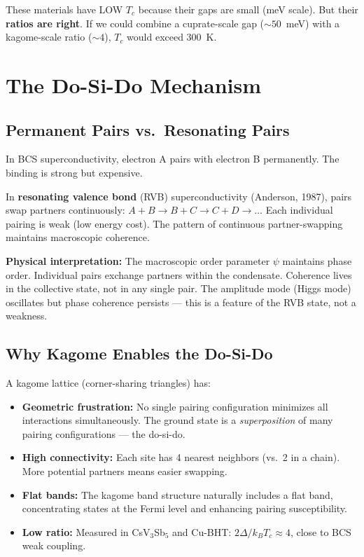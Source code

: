 \documentclass[11pt, a4paper]{article}
\begin{document}
These materials have LOW $T_c$ because their gaps are small
(meV scale). But their \textbf{ratios are right}. If we could
combine a cuprate-scale gap ($\sim 50$~meV) with a kagome-scale
ratio ($\sim 4$), $T_c$ would exceed 300~K.

\section{The Do-Si-Do Mechanism}

\subsection{Permanent Pairs vs.\ Resonating Pairs}

In BCS superconductivity, electron A pairs with electron B
permanently. The binding is strong but expensive.

In \textbf{resonating valence bond} (RVB) superconductivity
(Anderson, 1987), pairs swap partners continuously:
$A{+}B \to B{+}C \to C{+}D \to \ldots$
Each individual pairing is weak (low energy cost). The pattern
of continuous partner-swapping maintains macroscopic coherence.

\textbf{Physical interpretation:} The macroscopic order parameter
$\psi$ maintains phase order. Individual pairs exchange partners
within the condensate. Coherence lives in the collective state,
not in any single pair. The amplitude mode (Higgs mode) oscillates
but phase coherence persists --- this is a feature of the RVB
state, not a weakness.

\subsection{Why Kagome Enables the Do-Si-Do}

A kagome lattice (corner-sharing triangles) has:
\begin{itemize}[nosep]
  \item \textbf{Geometric frustration:} No single pairing
        configuration minimizes all interactions simultaneously.
        The ground state is a \emph{superposition} of many
        pairing configurations --- the do-si-do.
  \item \textbf{High connectivity:} Each site has 4 nearest
        neighbors (vs.\ 2 in a chain). More potential partners
        means easier swapping.
  \item \textbf{Flat bands:} The kagome band structure naturally
        includes a flat band, concentrating states at the Fermi
        level and enhancing pairing susceptibility.
  \item \textbf{Low ratio:} Measured in CsV$_3$Sb$_5$ and Cu-BHT:
        $2\Delta/k_B T_c \approx 4$, close to BCS weak coupling.
\end{itemize}
\end{document}
